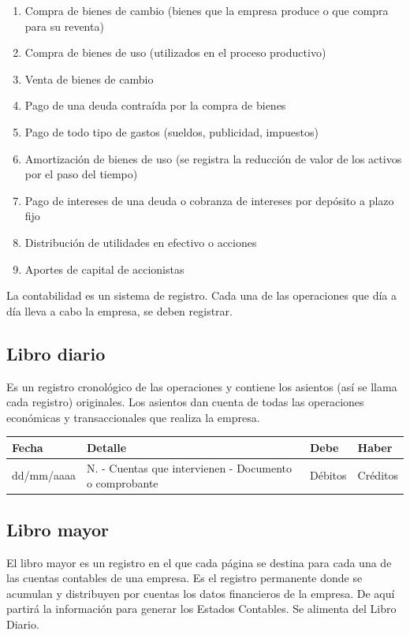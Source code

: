 \documentclass[titlepage,a4paper]{article}
\begin{document}
\begin{enumerate}
    \item Compra de bienes de cambio (bienes que la empresa produce o que compra para su reventa)
    \item Compra de bienes de uso (utilizados en el proceso productivo)
    \item Venta de bienes de cambio
    \item Pago de una deuda contraída por la compra de bienes
    \item Pago de todo tipo de gastos (sueldos, publicidad, impuestos)
    \item Amortización de bienes de uso (se registra la reducción de valor de los activos por el paso del tiempo)
    \item Pago de intereses de una deuda o cobranza de intereses por depósito a plazo fijo
    \item Distribución de utilidades en efectivo o acciones
    \item Aportes de capital de accionistas
\end{enumerate}

La contabilidad es un sistema de registro. Cada una de las operaciones que día a
día lleva a cabo la empresa, se deben registrar.

\subsection{Libro diario}
Es un registro cronológico de las operaciones y contiene los asientos (así se llama cada registro) originales.
Los asientos dan cuenta de todas las operaciones económicas y transaccionales que realiza la empresa.

\begin{table}[]
\begin{tabular}{|l|l|l|l|}
\hline
\textbf{Fecha}                   & \textbf{Detalle}                                       & \textbf{Debe} & \textbf{Haber} \\ \hline
\multicolumn{1}{|c|}{dd/mm/aaaa} & N. - Cuentas que intervienen - Documento o comprobante & Débitos       & Créditos       \\ \hline
\end{tabular}
\end{table}


\subsection{Libro mayor}
El libro mayor es un registro en el que cada página se destina para cada una de las cuentas contables de
una empresa. Es el registro permanente donde se acumulan y distribuyen por cuentas los datos financieros
de la empresa. De aquí partirá la información para generar los Estados Contables. Se alimenta del Libro Diario.
\end{document}
